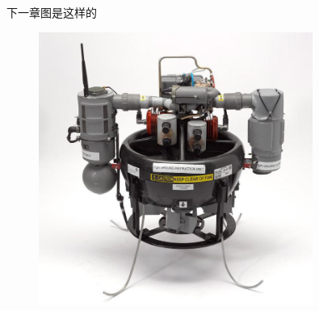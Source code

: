 下一章图是这样的
\begin{figure}[htbp]
	\centering
	\includegraphics[width=0.8\textwidth]{Fig/honeywell_t-hawk.jpg}
	\caption{\label{pic3}}
\end{figure}

